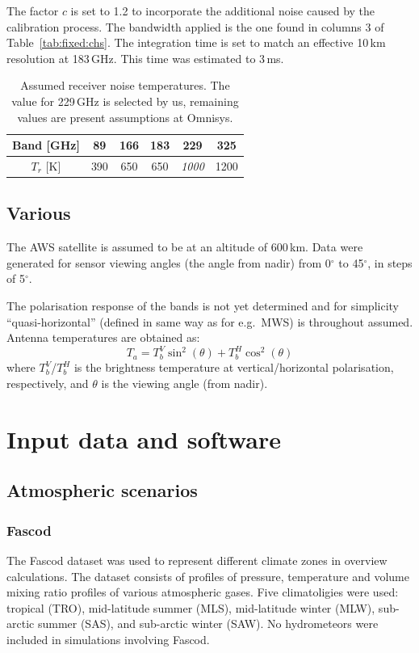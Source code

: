 \documentclass[12pt]{article}
\begin{document}
The factor $c$ is set to 1.2 to incorporate the additional noise caused by the
calibration process. The bandwidth applied is the one found in columns 3 of
Table~\ref{tab:fixed:chs}. The integration time is set to match an effective
10\,km resolution at 183\,GHz. This time was estimated to 3\,ms. 

\begin{table}[!bt]
  \centering
  \begin{tabular}[b]{c|ccccc}
    Band [GHz]   & 89 & 166 & 183 & 229 & 325 \\
    \hline
    $T_r$ [K]    & 390 & 650 & 650 & {\it 1000}  & 1200 \\
    \hline
  \end{tabular}
  \caption{Assumed receiver noise temperatures. The value for 229\,GHz is
    selected by us, remaining values are present assumptions at Omnisys.}
  \label{tab:trec}
\end{table}

\subsection{Various}
%
The AWS satellite is assumed to be at an altitude of 600\,km. Data were
generated for sensor viewing angles (the angle from nadir) from 0$^\circ$ to
45$^\circ$, in steps of 5$^\circ$.

The polarisation response of the bands is not yet determined and for simplicity
``quasi-horizontal'' (defined in same way as for e.g.\ MWS) is throughout
assumed. Antenna temperatures are obtained as:
\begin{equation}
  \label{eq:polrot}
  T_a = T_b^V\sin^2(\theta) + T_b^H\cos^2(\theta)
\end{equation}
where $T_b^V$/$T_b^H$ is the brightness temperature at vertical/horizontal
polarisation, respectively, and $\theta$ is the viewing angle (from nadir).



\section{Input data and software}

\subsection{Atmospheric scenarios}

\subsubsection{Fascod}
\label{sec:fascod}
%
The Fascod dataset \citep{anderson1986afgl} was used to represent different
climate zones in overview calculations. The dataset consists of profiles of
pressure, temperature and volume mixing ratio profiles of various atmospheric
gases. Five climatoligies were used: tropical (TRO), mid-latitude summer (MLS),
mid-latitude winter (MLW), sub-arctic summer (SAS), and sub-arctic winter
(SAW). No hydrometeors were included in simulations involving Fascod.
\end{document}
